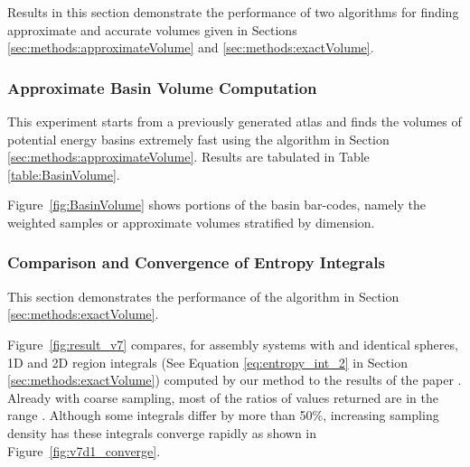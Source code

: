 \documentclass[]{article}
\newcommand{\figref}[1]{Figure~\ref{#1}}
\begin{document}
Results in this section demonstrate the performance of two algorithms
for finding approximate and accurate volumes given in 
Sections \ref{sec:methods:approximateVolume} and
\ref{sec:methods:exactVolume}.
\begin{figure*}[htpb]
\centering
{}
\caption{\scriptsize \textbf{Entropy Calculations}: (a) Convergence of entropy calculation as the step size decreases, 
		for multiple 1D active constraint regions (shown in different colors) in a  assembly landscape
with  identical spheres. The entropy integral values are scaled by the one with the smallest step size. 
		(b) \scriptsize Comparison of integral values computed by 4 different methods (shown in different colors) on multiple 
		3D active constraint regions for
a  assembly landscape with  identical spheres. See text in Section \ref{sec:results:ExactVolume}.
}
\end{figure*}
\subsubsection{Approximate Basin Volume Computation}
\label{sec:results:approximateVolume}
This experiment starts from a previously generated atlas
and finds the volumes of potential energy basins
extremely fast using the algorithm in Section \ref{sec:methods:approximateVolume}.
Results are tabulated in Table \ref{table:BasinVolume}. 

\figref{fig:BasinVolume} shows portions of the basin bar-codes, namely
the weighted samples or approximate volumes stratified by dimension.
\subsubsection{Comparison and Convergence of Entropy Integrals} 
\label{sec:results:ExactVolume}

This section demonstrates the performance of the algorithm in Section
\ref{sec:methods:exactVolume}.

\figref{fig:result_v7} compares, for  assembly systems with  and
 identical spheres, 1D and 2D region integrals (See Equation
\eqref{eq:entropy_int_2} in Section \ref{sec:methods:exactVolume}) computed by
our method to the results of the paper \cite{Holmes-Cerfon2013}. Already with
coarse sampling, most of the ratios of values returned are in the range . Although some integrals differ by more than 50\%, increasing sampling density has
these integrals converge rapidly as shown in \figref{fig:v7d1_converge}.
\end{document}
